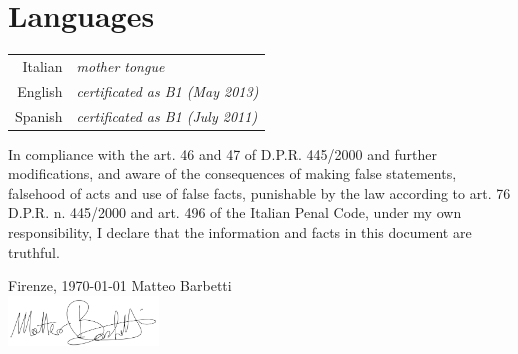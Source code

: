 \documentclass[a4, 11pt]{report}
\begin{document}
    \vskip 9mm

    \section*{Languages}
        \begin{tabular}{rl}
            Italian & {\small \emph {mother tongue}}\\
            English & {\small \emph {certificated as B1 (May 2013)}}\\
            Spanish & {\small \emph {certificated as B1 (July 2011)}}
        \end{tabular}

    \vskip 15mm

    \noindent
    {\small In compliance with the art. 46 and 47 of D.P.R. 445/2000 and further modifications, and aware of the consequences of making 
    false statements, falsehood of acts and use of false facts, punishable by the law according to art. 76 D.P.R. n. 445/2000
    and art. 496 of the Italian Penal Code, under my own responsibility, I declare that the information and facts in this document
    are truthful.}
  
    \vskip 6mm 
  
    \noindent
    {\small Firenze, \today}
    \hfill {\small Matteo Barbetti}\\ [3mm]
    \null \hfill \includegraphics[width=0.30\textwidth]{academic-cv/phd-applications/img/signature.png}
  
\end{document}
